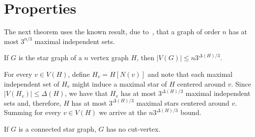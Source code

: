 \section{Properties}
The next theorem uses the known result, due to~\cite{moon_moser}, that a graph of order $n$ has at most $3^{n/3}$ maximal independent sets.

\begin{theorem}
    If $G$ is the star graph of a $n$ vertex graph $H$, then $|V(G)| \leq n3^{\Delta(H)/3}$.
\end{theorem}

\begin{tproof}
    For every $v \in V(H)$, define $H_v = H[N(v)]$ and note that each maximal independent set of $H_v$ might induce a maximal star of $H$ centered around $v$.
    Since $|V(H_v)| \leq \Delta(H)$, we have that $H_v$ has at most $3^{\Delta(H)/3}$ maximal independent sets and, therefore, $H$ has at most $3^{\Delta(H)/3}$ maximal stars centered around $v$.
    Summing for every $v \in V(H)$ we arrive at the $n3^{\Delta(H)/3}$ bound.
\end{tproof}

\begin{theorem}
    \label{thm:star_cutless}
    If $G$ is a connected star graph, $G$ has no cut-vertex.
\end{theorem}

